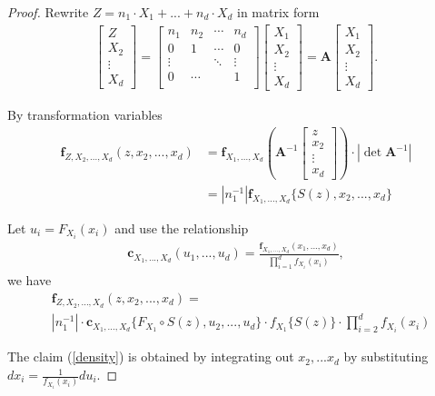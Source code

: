 \begin{proof}
   Rewrite $Z = n_1 \cdot X_1 + ... +  n_d \cdot X_d $ in matrix form
   \begin{align}
      \begin{bmatrix}
      Z \\ X_2 \\ \vdots \\ X_d
      \end{bmatrix}
      = \begin{bmatrix}
      n_1    & n_2   & \cdots & n_d     \\
      0      & 1     &  \cdots & 0       \\
      \vdots &       & \ddots & \vdots \\
      0      & \cdots &       & 1  \\
      \end{bmatrix}
      \begin{bmatrix}
         X_1 \\ X_2 \\ \vdots \\ X_d
      \end{bmatrix}
      = \bm{A}
      \begin{bmatrix}
         X_1 \\ X_2 \\ \vdots \\ X_d
      \end{bmatrix}.
      \end{align} \medskip

   By transformation variables
   \begin{align}
      \bm{f}_{Z,X_2,...,X_d}(z, x_2, ...,x_d) &= \bm{f}_{X_1,...,X_d}\left( \bm{A}^{-1}
      \begin{bmatrix}
         z \\ x_2 \\ \vdots \\ x_d
      \end{bmatrix}
      \right)  \cdot |\det \bm{A}^{-1}| \\
      &= \left| n_1^{-1} \right| \bm{f}_{X_1,...,X_d}\{S(z), x_2,...,x_d\}
      \end{align} \medskip

   Let $u_i = F_{X_i}(x_i)$ and
   use the relationship
   \begin{align}
      \bm{c}_{X_1,...,X_d}(u_1, ..., u_d)=\frac{\bm{f}_{X_1,...,X_d}(x_1,...,x_d)}{\prod_{i=1}^d f_{X_i}(x_i)},
   \end{align}
   we have
   \begin{align}
     & \bm{f}_{Z,X_2,...,X_d}(z, x_2, ...,x_d) = \\
      & \left| n_1^{-1} \right| \cdot
      \bm{c}_{X_1,...,X_d}\{F_{X_1} \circ S(z), u_2, ...,  u_d\}  \cdot
      f_{X_1} \{ S(z) \} \cdot
      \prod_{i=2}^d f_{X_i}(x_i)
      \end{align}

   The claim (\ref{density}) is obtained by integrating out $x_2, ... x_d$ by substituting $dx_i = \frac{1}{f_{X_i}(x_i)}du_i$.
   \end{proof}


